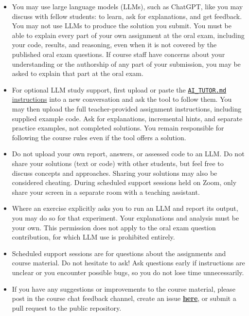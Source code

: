 \begin{itemize}
\item You may use large language models (LLMs), such as ChatGPT, like you may discuss with fellow students: to learn, ask for explanations, and get feedback. You may not use LLMs to produce the solution you submit. You must be able to explain every part of your own assignment at the oral exam, including your code, results, and reasoning, even when it is not covered by the published oral exam questions. If course staff have concerns about your understanding or the authorship of any part of your submission, you may be asked to explain that part at the oral exam.

\item For optional LLM study support, first upload or paste the \href{https://raw.githubusercontent.com/MansMeg/IntroML/master/assignments/AI_TUTOR.md}{\texttt{AI\_TUTOR.md} instructions} into a new conversation and ask the tool to follow them. You may then upload the full teacher-provided assignment instructions, including supplied example code. Ask for explanations, incremental hints, and separate practice examples, not completed solutions. You remain responsible for following the course rules even if the tool offers a solution.

\item Do not upload your own report, answers, or assessed code to an LLM. Do not share your solutions (text or code) with other students, but feel free to discuss concepts and approaches. Sharing your solutions may also be considered cheating. During scheduled support sessions held on Zoom, only share your screen in a separate room with a teaching assistant.

\item Where an exercise explicitly asks you to run an LLM and report its output, you may do so for that experiment. Your explanations and analysis must be your own. This permission does not apply to the oral exam question contribution, for which LLM use is prohibited entirely.

\item Scheduled support sessions are for questions about the assignments and course material. Do not hesitate to ask! Ask questions early if instructions are unclear or you encounter possible bugs, so you do not lose time unnecessarily.

\item If you have any suggestions or improvements to the course material, please post in the course chat feedback channel, create an issue \href{https://github.com/MansMeg/IntroML/issues}{\textbf{here}}, or submit a pull request to the public repository.

\end{itemize}


